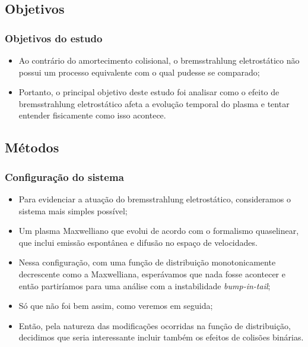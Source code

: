 \documentclass[10pt,aspectratio=1610,lualatex]{beamer}
\begin{document}
\subsection*{Objetivos}
\begin{frame}
  \frametitle{Objetivos do estudo}
  \begin{itemize}
    \item Ao contrário do amortecimento colisional, o bremsstrahlung
    eletrostático não possui um processo equivalente com o qual pudesse
    se comparado;
    \vspace{0.5cm}
    \item Portanto, o principal objetivo deste estudo foi analisar
    como o efeito de bremsstrahlung eletrostático afeta a evolução
    temporal do plasma e tentar entender fisicamente como isso
    acontece.
  \end{itemize}
\end{frame}

\subsection*{Métodos}
\begin{frame}
  \frametitle{Configuração do sistema}
  \begin{itemize}
    \item Para evidenciar a atuação do bremsstrahlung eletrostático,
    consideramos o sistema mais simples possível;
    \vspace{0.4cm}
    \pause
    \item Um plasma Maxwelliano que evolui de acordo com o formalismo
    quaselinear, que inclui emissão espontânea e difusão no espaço
    de velocidades.
    \vspace{0.4cm}
    \pause
    \item Nessa configuração, com uma função de distribuição monotonicamente
    decrescente como a Maxwelliana, esperávamos que nada fosse acontecer e
    então partiríamos para uma análise com a instabilidade \emph{bump-in-tail};
    \vspace{0.4cm}
    \pause
    \item Só que não foi bem assim, como veremos em seguida;
    \vspace{0.4cm}
    \pause
    \item Então, pela natureza das modificações ocorridas na função de
    distribuição, decidimos que seria interessante incluir também os
    efeitos de colisões binárias.
  \end{itemize}
\end{frame}
\end{document}
